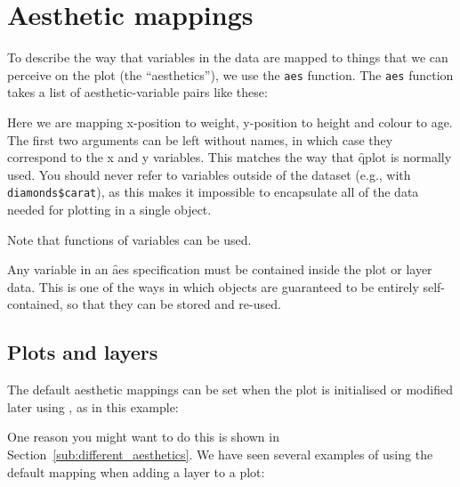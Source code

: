 \section{Aesthetic mappings}
\label{sec:aes}

To describe the way that variables in the data are mapped to things that we can perceive on the plot (the ``aesthetics''), we use the {\tt aes} function.  The {\tt aes} function takes a list of aesthetic-variable pairs like these:

% 


Here we are mapping x-position to weight, y-position to height and colour to age.  The first two arguments can be left without names, in which case they correspond to the x and y variables.  This matches the way that \f{qplot} is normally used.  You should never refer to variables outside of the dataset (e.g., with \verb|diamonds$carat|), as this makes it impossible to encapsulate all of the data needed for plotting in a single object.

% 

\noindent Note that functions of variables can be used.

Any variable in an \f{aes} specification must be contained inside the plot or layer data.  This is one of the ways in which \ggplot objects are guaranteed to be entirely self-contained, so that they can be stored and re-used.

\subsection{Plots and layers}
\label{sub:plots_and_layers}

The default aesthetic mappings can be set when the plot is initialised or modified later using \code{+}, as in this example:

% 
%


One reason you might want to do this is shown in Section~\ref{sub:different_aesthetics}.  We have seen several examples of using the default mapping when adding a layer to a plot:

% 


